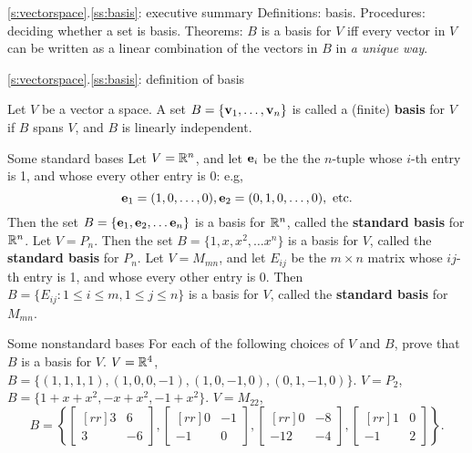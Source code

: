 \begin{frame}{\ref{s:vectorspace}.\ref{ss:basis}: executive summary}
\alert{Definitions:} basis.
\bspace
\alert{Procedures:} deciding whether a set is basis.
\bspace
\alert{Theorems:} $B$ is a basis for $V$ iff every vector in $V$ can be written as a linear combination of the vectors in $B$ in {\em a unique way}.

\end{frame}
\begin{frame}{\ref{s:vectorspace}.\ref{ss:basis}: definition of basis}
\begin{definition}
Let $V$ be a vector a space. A set $B=\{{\mathbf v}_1,\dots,{\mathbf v}_n\}$ is called a (finite) {\bf basis} for $V$ if 
\bb[(i)]
\ii $B$ spans $V$, and 
\ii $B$ is linearly independent.
\ee
\end{definition}
\pause
\begin{comment}
You should think of a basis $B$ as a ``minimal" set of vectors needed to generate the space $V$. 
\bpause
Condition (i) ensures all elements of $V$ can be written as a linear combination of the $\boldv_i$. Thus $B$ generates $V$. 
\bpause 
Condition (ii) ensures we have no redundant elements in our set $B$. Thus $B$ is minimal. 
\end{comment}
\end{frame}
\begin{frame}{Some standard bases}
\bb
\ii Let $V={\mathbb R}^n$, and let ${\mathbf e}_i$ be the the $n$-tuple whose $i$-th entry is 1, and whose every other entry is 0: e.g, 
\[
{\mathbf e}_1=(1,0,\dots,0), {\mathbf e}_2=(0,1,0,\dots, 0),\text{ etc.}
\]
Then the set $B=\{{\mathbf e}_1,{\mathbf e}_2,\dots {\mathbf e}_n\}$ is a basis for ${\mathbb R}^n$, called the {\bf standard basis} for ${\mathbb R}^n$. 
\pause
\ii Let $V=P_n$. Then the set $B=\{1, x, x^2, \dots x^{n}\}$ is a basis for $V$, called the {\bf standard basis} for $P_n$. 
\pause
\ii Let $V=M_{mn}$, and let $E_{ij}$ be the $m\times n$ matrix whose $ij$-th entry is 1, and whose every other entry is 0. Then $ B=\{E_{ij}\colon 1\leq i\leq m, 1\leq j\leq n\}$ is a basis for $V$, called the {\bf standard basis} for $M_{mn}$.
\ee
\end{frame}
\begin{frame}{Some nonstandard bases}
For each of the following choices of $V$ and $B$, prove that $B$ is a basis for $V$. 
\bb
\ii $V={\mathbb R}^4$, $B=\{(1,1,1,1), (1,0,0,-1), (1,0,-1,0), (0,1,-1,0)\}$.
\ii $V=P_2$, $B=\{1+x+x^2, -x+x^2, -1+x^2\}$.
\ii $V=M_{22}$, 
\[
B=\left\{
\begin{bmatrix}[rr]
3&6\\
3&-6
\end{bmatrix},
\begin{bmatrix}[rr]
0&-1\\
-1&0
\end{bmatrix},
\begin{bmatrix}[rr]
0&-8\\
-12&-4
\end{bmatrix},
\begin{bmatrix}[rr]
1&0\\
-1&2
\end{bmatrix}
\right\}.
\]
\ee
\end{frame}
